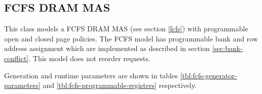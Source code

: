 \clearpage
\subsection{FCFS DRAM MAS} This class models a FCFS DRAM MAS (see section
\ref{fcfs}) with programmable open and closed page policies. The FCFS model
has programmable bank and row address assignment which are implemented as described in
section \ref{sec:bank-conflict}. This model does not reorder requests.

\noindent Generation and runtime parameters are shown in tables
\ref{tbl:fcfs-generator-parameters} and \ref{tbl:fcfs-programmable-registers}
respectively.

\begin{table}[htb]
\begin{center}
\end{center}
\caption{Additional generation parameters of the FCFS DRAM MAS model.}
\label{tbl:fcfs-generator-parameters}
\end{table}%

